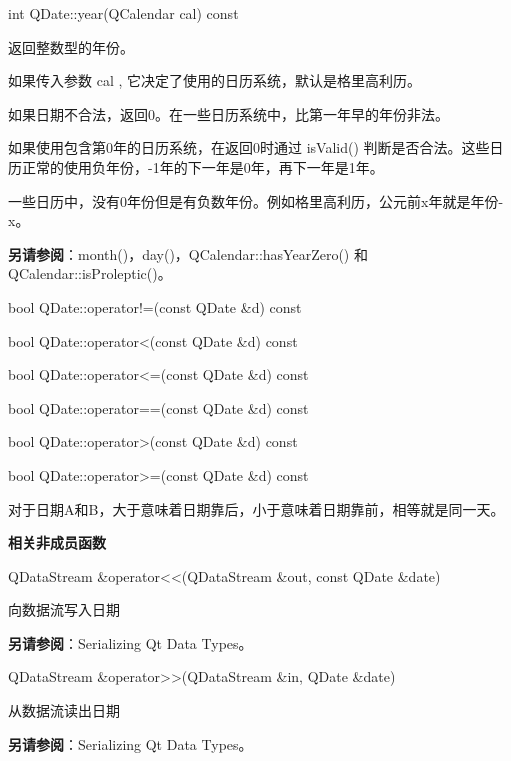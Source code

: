 int QDate::year(QCalendar cal) const

返回整数型的年份。

如果传入参数 cal , 它决定了使用的日历系统，默认是格里高利历。

如果日期不合法，返回0。在一些日历系统中，比第一年早的年份非法。

如果使用包含第0年的日历系统，在返回0时通过 isValid() 判断是否合法。这些日历正常的使用负年份，-1年的下一年是0年，再下一年是1年。

一些日历中，没有0年份但是有负数年份。例如格里高利历，公元前x年就是年份-x。

\textbf{另请参阅}：month()，day()，QCalendar::hasYearZero() 和
QCalendar::isProleptic()。

\splitLine

bool QDate::operator!=(const QDate \&d) const

bool QDate::operator<(const QDate \&d) const

bool QDate::operator<=(const QDate \&d) const

bool QDate::operator==(const QDate \&d) const

bool QDate::operator>(const QDate \&d) const

bool QDate::operator>=(const QDate \&d) const

对于日期A和B，大于意味着日期靠后，小于意味着日期靠前，相等就是同一天。

\splitLine


\textbf{相关非成员函数}

QDataStream \&operator<<(QDataStream \&out, const QDate \&date)

向数据流写入日期

\textbf{另请参阅}：Serializing Qt Data Types。

QDataStream \&operator>>(QDataStream \&in, QDate \&date)

从数据流读出日期

\textbf{另请参阅}：Serializing Qt Data Types。

